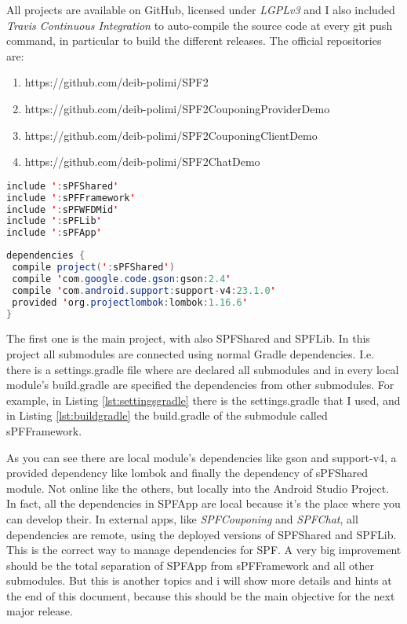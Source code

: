 All projects are available on GitHub, licensed under \emph{LGPLv3} and I also included \emph{Travis Continuous Integration} to auto-compile the source code at every \textsf{git push} command, in particular to build the different releases.
The official repositories are:
\begin{enumerate}
	\item https://github.com/deib-polimi/SPF2
	\item https://github.com/deib-polimi/SPF2CouponingProviderDemo
	\item https://github.com/deib-polimi/SPF2CouponingClientDemo
	\item https://github.com/deib-polimi/SPF2ChatDemo
\end{enumerate}

\begin{lstlisting}[caption={settings.gradle},label=lst:settingsgradle, language=Java]
include ':sPFShared'
include ':sPFFramework'
include ':sPFWFDMid'
include ':sPFLib'
include ':sPFApp'
\end{lstlisting}

\begin{lstlisting}[caption={build.gradle},label=lst:buildgradle, language=Java]
dependencies {
 compile project(':sPFShared')
 compile 'com.google.code.gson:gson:2.4'
 compile 'com.android.support:support-v4:23.1.0'
 provided 'org.projectlombok:lombok:1.16.6'
}
\end{lstlisting}

The first one is the main project, with also \textsf{SPFShared} and \textsf{SPFLib}. In this project all submodules are connected using normal Gradle dependencies.
I.e. there is a \textsf{settings.gradle} file where are declared all submodules and in every local module's \textsf{build.gradle} are specified the dependencies from other submodules. For example, in Listing \ref{lst:settingsgradle} there is the \textsf{settings.gradle} that I used, and in Listing \ref{lst:buildgradle} the \textsf{build.gradle} of the submodule called \textsf{sPFFramework}.

As you can see there are local module's dependencies like \textsf{gson} and \textsf{support-v4}, a provided dependency like \textsf{lombok} and finally the dependency of \textsf{sPFShared} module. Not online like the others, but locally into the Android Studio Project. In fact, all the dependencies in \textsf{SPFApp} are local because it's the place where you can develop their. In external apps, like \emph{SPFCouponing} and \emph{SPFChat}, all dependencies are remote, using the deployed versions of \textsf{SPFShared} and \textsf{SPFLib}. This is the correct way to manage dependencies for SPF.
A very big improvement should be the total separation of \textsf{SPFApp} from \textsf{sPFFramework} and all other submodules. But this is another topics and i will show more details and hints at the end of this document, because this should be the main objective for the next major release.

